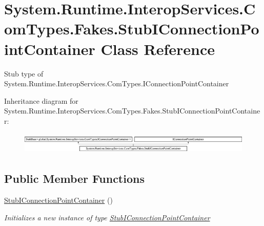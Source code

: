 \hypertarget{class_system_1_1_runtime_1_1_interop_services_1_1_com_types_1_1_fakes_1_1_stub_i_connection_point_container}{\section{System.\-Runtime.\-Interop\-Services.\-Com\-Types.\-Fakes.\-Stub\-I\-Connection\-Point\-Container Class Reference}
\label{class_system_1_1_runtime_1_1_interop_services_1_1_com_types_1_1_fakes_1_1_stub_i_connection_point_container}
}


Stub type of System.\-Runtime.\-Interop\-Services.\-Com\-Types.\-I\-Connection\-Point\-Container 


Inheritance diagram for System.\-Runtime.\-Interop\-Services.\-Com\-Types.\-Fakes.\-Stub\-I\-Connection\-Point\-Container\-:\begin{figure}[H]
\begin{center}
\leavevmode
\includegraphics[height=1.050657cm]{class_system_1_1_runtime_1_1_interop_services_1_1_com_types_1_1_fakes_1_1_stub_i_connection_point_container}
\end{center}
\end{figure}
\subsection*{Public Member Functions}
\begin{DoxyCompactItemize}
\item 
\hyperlink{class_system_1_1_runtime_1_1_interop_services_1_1_com_types_1_1_fakes_1_1_stub_i_connection_point_container_a3bf8881692b5554525175c5c6aad2d91}{Stub\-I\-Connection\-Point\-Container} ()
\begin{DoxyCompactList}\small\item\em Initializes a new instance of type \hyperlink{class_system_1_1_runtime_1_1_interop_services_1_1_com_types_1_1_fakes_1_1_stub_i_connection_point_container}{Stub\-I\-Connection\-Point\-Container}\end{DoxyCompactList}\end{DoxyCompactItemize}

